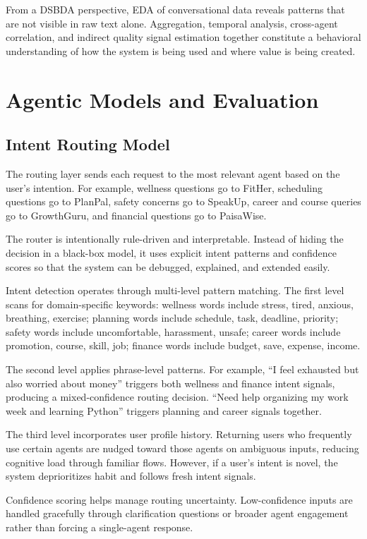 \documentclass[oneside,a4paper,12pt]{report}
\begin{document}
From a DSBDA perspective, EDA of conversational data reveals patterns that are not visible in raw text alone. Aggregation, temporal analysis, cross-agent correlation, and indirect quality signal estimation together constitute a behavioral understanding of how the system is being used and where value is being created.

\chapter{Agentic Models and Evaluation}
\section{Intent Routing Model}
The routing layer sends each request to the most relevant agent based on the user's intention. For example, wellness questions go to FitHer, scheduling questions go to PlanPal, safety concerns go to SpeakUp, career and course queries go to GrowthGuru, and financial questions go to PaisaWise.

The router is intentionally rule-driven and interpretable. Instead of hiding the decision in a black-box model, it uses explicit intent patterns and confidence scores so that the system can be debugged, explained, and extended easily.

Intent detection operates through multi-level pattern matching. The first level scans for domain-specific keywords: wellness words include stress, tired, anxious, breathing, exercise; planning words include schedule, task, deadline, priority; safety words include uncomfortable, harassment, unsafe; career words include promotion, course, skill, job; finance words include budget, save, expense, income.

The second level applies phrase-level patterns. For example, ``I feel exhausted but also worried about money'' triggers both wellness and finance intent signals, producing a mixed-confidence routing decision. ``Need help organizing my work week and learning Python'' triggers planning and career signals together.

The third level incorporates user profile history. Returning users who frequently use certain agents are nudged toward those agents on ambiguous inputs, reducing cognitive load through familiar flows. However, if a user's intent is novel, the system deprioritizes habit and follows fresh intent signals.

Confidence scoring helps manage routing uncertainty. Low-confidence inputs are handled gracefully through clarification questions or broader agent engagement rather than forcing a single-agent response.
\end{document}
